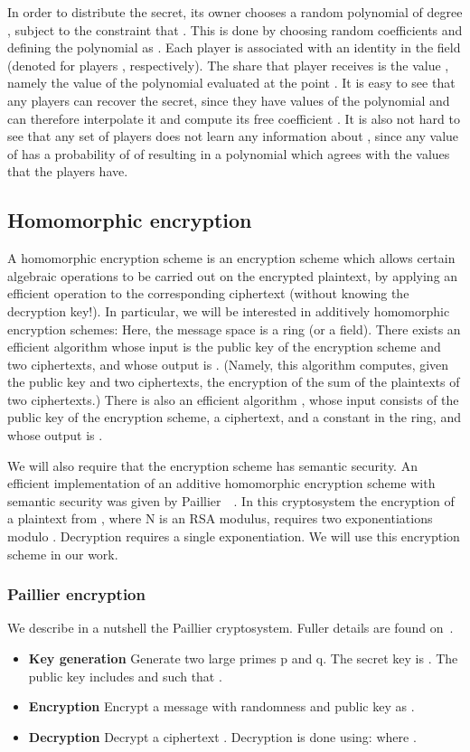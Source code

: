 \documentclass[times, 10pt,twocolumn]{article}
\begin{document}
In order to distribute the secret, its owner chooses a random
polynomial  of degree , subject to the constraint that
. This is done by choosing random coefficients
 and defining the polynomial as
. Each player is associated with an
identity in the field (denoted \/ for players
, respectively). The share that player  receives is the
value , namely the value of the polynomial evaluated at the
point .  It is easy to see that any  players can recover the
secret, since they have  values of the polynomial and can therefore
interpolate it and compute its free coefficient . It is also not
hard to see that any set of  players does not learn any
information about , since any value of  has a probability of
 of resulting in a polynomial which agrees with the values that
the players have.
\subsection{Homomorphic encryption}
A homomorphic encryption scheme is an encryption scheme which
allows certain algebraic operations to be carried out on the
encrypted plaintext, by applying an efficient operation to the
corresponding ciphertext (without knowing the decryption key!).
In particular, we will be interested in additively homomorphic
encryption schemes: Here, the message space is a ring (or
a field). There exists an efficient algorithm 
whose input is the public key of the encryption scheme and two
ciphertexts, and whose output is . (Namely, this algorithm computes, given the
public key and two ciphertexts, the encryption of the sum of the
plaintexts of two ciphertexts.) There is also an efficient
algorithm , whose input consists of the public key of
the encryption scheme, a ciphertext, and a constant  in the
ring, and whose output is  .

We will also  require that the encryption scheme has semantic security.
An efficient implementation of an
additive homomorphic encryption scheme with semantic security was
given by Paillier~~\cite{Paillier}. In this cryptosystem the
encryption of a plaintext from , where N is an RSA modulus,
requires two exponentiations modulo . Decryption requires a
single exponentiation. We will use this encryption scheme in our work.

\subsubsection{Paillier encryption}
We describe in a nutshell the Paillier cryptosystem. Fuller
details are found on~\cite{Paillier}.
\begin{itemize}
    \item {\bf Key generation} Generate two large primes p
and q. The secret key  is . The
public key  includes  and 
such that .
    \item {\bf Encryption} Encrypt a message  with randomness
 and public key  as .
    \item {\bf Decryption} Decrypt a ciphertext .
    Decryption is done using:  where .
\end{itemize}
\end{document}
